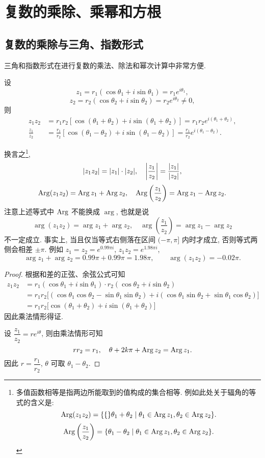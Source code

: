 \section{复数的乘除、乘幂和方根}

\subsection{复数的乘除与三角、指数形式}

三角和指数形式在进行复数的乘法、除法和幂次计算中非常方便.

\begin{theorem}
  设
  \[z_1=r_1(\cos\theta_1+i\sin\theta_1)=r_1e^{i\theta_1},\]
  \[z_2=r_2(\cos\theta_2+i\sin\theta_2)=r_2e^{i\theta_2}\neq 0,\]
  则
  \begin{align*}
    z_1z_2&=r_1r_2[\cos(\theta_1+\theta_2)+i\sin(\theta_1+\theta_2)]=r_1r_2e^{i(\theta_1+\theta_2)},\\
    \frac{z_1}{z_2}&=\frac{r_1}{r_2}[\cos(\theta_1-\theta_2)+i\sin(\theta_1-\theta_2)]=\frac{r_1}{r_2}e^{i(\theta_1-\theta_2)}.
  \end{align*}
\end{theorem}

换言之\footnote{多值函数相等是指两边所能取到的值构成的集合相等.
例如此处关于辐角的等式的含义是:
\[\operatorname{Arg}(z_1z_2)={\left\{\{\right\}}\theta_1+\theta_2\mid\theta_1\in\operatorname{Arg} z_1,\theta_2\in\operatorname{Arg} z_2\}.\]
\[\operatorname{Arg}\left(\frac{z_1}{z_2}\right)=\{\theta_1-\theta_2\mid\theta_1\in\operatorname{Arg} z_1,\theta_2\in\operatorname{Arg} z_2\}.\]
},
\[|z_1z_2|=|z_1|\cdot|z_2|,\quad\left|\frac{z_1}{z_2}\right|=\frac{|z_1|}{|z_2|},\]
\[\operatorname{Arg}(z_1z_2)=\operatorname{Arg} z_1+\operatorname{Arg} z_2,\quad
\operatorname{Arg}\left(\frac{z_1}{z_2}\right)=\operatorname{Arg} z_1-\operatorname{Arg} z_2.\]
注意上述等式中 $\operatorname{Arg}$ 不能换成 $\arg$, 也就是说
\[\arg(z_1z_2)=\arg z_1+\arg z_2,\quad
\arg\left(\frac{z_1}{z_2}\right)=\arg z_1-\arg z_2\]
\alert{不一定成立}.
事实上, 当且仅当等式右侧落在区间 $(-\pi,\pi]$ 内时才成立, 否则等式两侧会相差 $\pm\pi$.
例如 $z_1=z_2=e^{0.99\pi i}$, $z_1z_2=e^{1.98\pi i}$,
\[\arg z_1+\arg z_2=0.99\pi+0.99\pi=1.98\pi,\qquad
\arg(z_1z_2)=-0.02\pi.\]

\begin{proof}
  根据和差的正弦、余弦公式可知
  \begin{align*}
    z_1z_2&=r_1(\cos\theta_1+i\sin\theta_1)\cdot
    r_2(\cos\theta_2+i\sin\theta_2)\\
    &{=r_1r_2\bigl[(\cos\theta_1\cos\theta_2-\sin\theta_1\sin\theta_2)
    +i(\cos\theta_1\sin\theta_2+\sin\theta_1\cos\theta_2)\bigr]}\\
    &{=r_1r_2\bigl[\cos(\theta_1+\theta_2)+i\sin(\theta_1+\theta_2)\bigr]}
  \end{align*}
  因此乘法情形得证.

  设 $\dfrac{z_1}{z_2}=re^{i\theta}$, 则由乘法情形可知
    \[rr_2=r_1,\quad \theta+2k\pi+\operatorname{Arg} z_2=\operatorname{Arg} z_1.\]
  因此 $r=\dfrac{r_1}{r_2}$, $\theta$ 可取 $\theta_1-\theta_2$.
\end{proof}


